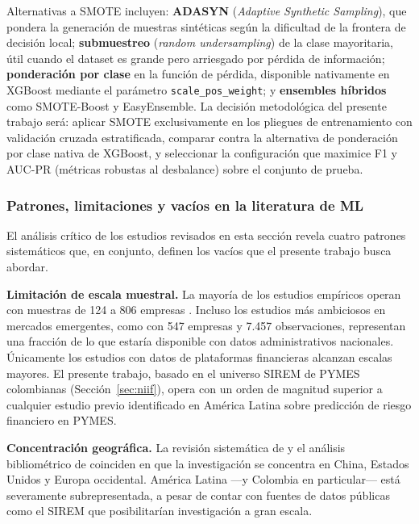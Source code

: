 \documentclass[12pt, letterpaper]{article}
\begin{document}
Alternativas a SMOTE incluyen: \textbf{ADASYN} (\textit{Adaptive Synthetic Sampling}), que pondera la generaci\'on de muestras sint\'eticas seg\'un la dificultad de la frontera de decisi\'on local; \textbf{submuestreo} (\textit{random undersampling}) de la clase mayoritaria, \'util cuando el dataset es grande pero arriesgado por p\'erdida de informaci\'on; \textbf{ponderaci\'on por clase} en la funci\'on de p\'erdida, disponible nativamente en XGBoost mediante el par\'ametro \texttt{scale\_pos\_weight}; y \textbf{ensembles h\'ibridos} como SMOTE-Boost y EasyEnsemble. La decisi\'on metodol\'ogica del presente trabajo ser\'a: aplicar SMOTE exclusivamente en los pliegues de entrenamiento con validaci\'on cruzada estratificada, comparar contra la alternativa de ponderaci\'on por clase nativa de XGBoost, y seleccionar la configuraci\'on que maximice F1 y AUC-PR (m\'etricas robustas al desbalance) sobre el conjunto de prueba.

\subsubsection{Patrones, limitaciones y vac\'ios en la literatura de ML}

El an\'alisis cr\'itico de los estudios revisados en esta secci\'on revela cuatro patrones sistem\'aticos que, en conjunto, definen los vac\'ios que el presente trabajo busca abordar.

\textbf{Limitaci\'on de escala muestral.} La mayor\'ia de los estudios emp\'iricos operan con muestras de 124 a 806 empresas \citep{Boumhidi2025, PtakChmielewska2020, Bortolotti2024}. Incluso los estudios m\'as ambiciosos en mercados emergentes, como \citet{Mahesh2025} con 547 empresas y 7.457 observaciones, representan una fracci\'on de lo que estar\'ia disponible con datos administrativos nacionales. \'Unicamente los estudios con datos de plataformas financieras \citep{Yufenyuy2024} alcanzan escalas mayores. El presente trabajo, basado en el universo SIREM de PYMES colombianas (Secci\'on~\ref{sec:niif}), opera con un orden de magnitud superior a cualquier estudio previo identificado en Am\'erica Latina sobre predicci\'on de riesgo financiero en PYMES.

\textbf{Concentraci\'on geogr\'afica.} La revisi\'on sistem\'atica de \citet{Paz2025} y el an\'alisis bibliom\'etrico de \citet{Abubakar2025} coinciden en que la investigaci\'on se concentra en China, Estados Unidos y Europa occidental. Am\'erica Latina ---y Colombia en particular--- est\'a severamente subrepresentada, a pesar de contar con fuentes de datos p\'ublicas como el SIREM que posibilitar\'ian investigaci\'on a gran escala.
\end{document}
